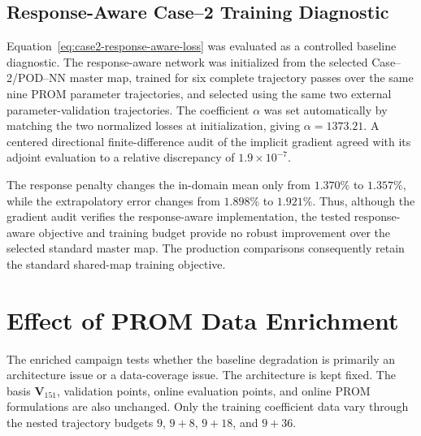 \documentclass[11pt]{article}
\newcommand{\V}{\mathbf V}
\newcommand{\uvec}{\mathbf u}
\newcommand{\mub}{\bm\mu}
\begin{document}
\subsection{Response-Aware Case--2 Training Diagnostic}
\label{sec:case2-response-aware}
Equation~\eqref{eq:case2-response-aware-loss} was evaluated as a controlled
baseline diagnostic.  The response-aware network was initialized from the
selected Case--2/POD--NN master map, trained for six complete trajectory passes
over the same nine PROM parameter trajectories, and selected using the same
two external parameter-validation trajectories.  The coefficient \(\alpha\)
was set automatically by matching the two normalized losses at
initialization, giving \(\alpha=1373.21\).  A centered directional
finite-difference audit of the implicit gradient agreed with its adjoint
evaluation to a relative discrepancy of \(1.9\times10^{-7}\).

\begin{table}[H]
\centering
\caption{Baseline Case--2 response-aware training diagnostic for \(n=10\).
Entries are online state errors
\(100\lVert\uvec_{\mathrm{HDM}}-\uvec_{\mathrm{ROM}}\rVert_F/
\lVert\uvec_{\mathrm{HDM}}\rVert_F\).  The mean averages
\(\mub^{(v)},\mub^{(1)},\mub^{(2)}\).  The response-aware model is
initialized from the selected standard master map.  Both evaluations use the
same basis, full-residual online solver, and external parameter-validation
set; they differ only in the offline learning objective.}
\label{tab:prom-case2-response-aware}

\end{table}

The response penalty changes the in-domain mean only from \(1.370\%\) to
\(1.357\%\), while the extrapolatory error changes from \(1.898\%\) to
\(1.921\%\).  Thus, although the gradient audit verifies the response-aware
implementation, the tested response-aware objective and training budget
provide no robust improvement over the selected standard master map.  The
production comparisons consequently retain the standard shared-map training
objective.

\section{Effect of PROM Data Enrichment}
\label{sec:prom-enrichment}
The enriched campaign tests whether the baseline degradation is primarily an architecture issue or a data-coverage
issue.  The architecture is kept fixed.  The basis \(\V_{151}\), validation points, online evaluation points, and
online PROM formulations are also unchanged.  Only the training coefficient data vary through the nested
trajectory budgets $9$, $9+8$, $9+18$, and $9+36$.
\end{document}
